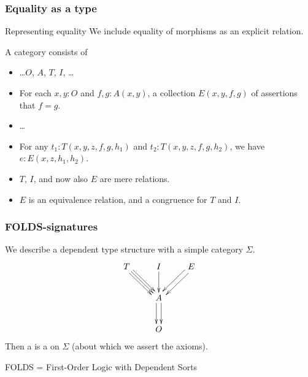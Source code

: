 \documentclass{beamer}
\begin{document}
\begin{frame}[t]
  \frametitle{Equality as a type}
  \begin{block}{Representing equality}
    We include \alert{equality of morphisms} as an explicit relation.
  \end{block}
  A category consists of
  \begin{itemize}
  \item \dots $O$, $A$, $T$, $I$, \dots
  \item For each $x,y:O$ and $f,g:A(x,y)$, a collection $E(x,y,f,g)$ of \alert{assertions that $f=g$}.
  \item \dots
    \pause
  \item For any $t_1:T(x,y,z,f,g,h_1)$ and $t_2:T(x,y,z,f,g,h_2)$, we have $e : E(x,z,h_1,h_2)$.
    \pause
  \item $T$, $I$, and now also $E$ are mere relations.
  \item $E$ is an equivalence relation, and a congruence for $T$ and $I$.
  \end{itemize}
\end{frame}

\begin{frame}
  \frametitle{FOLDS-signatures}
  We describe a dependent type structure with a \alert{simple category} $\Sigma$.
  \[
  \vcenter{\xymatrix{
      T \ar[dr] \ar@<1mm>[dr] \ar@<-1mm>[dr] & I \ar[d] & E \ar@<1mm>[dl] \ar@<-1mm>[dl] \\
      & A \ar@<1mm>[d] \ar@<-1mm>[d] \\
      & O}}
  \]
  Then a  is a  on $\Sigma$ (about which we assert the axioms).

  \medskip
  \alert{FOLDS} = \alert{F}irst-\alert{O}rder \alert{L}ogic with \alert{D}ependent \alert{S}orts
\end{frame}
\end{document}
